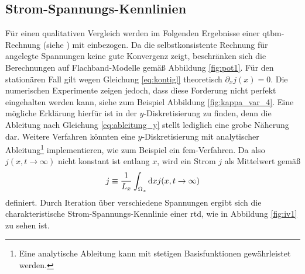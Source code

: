 \subsection{Strom-Spannungs-Kennlinien}
Für einen qualitativen Vergleich werden im Folgenden Ergebnisse einer \ac{qtbm}-Rechnung (siehe \cite{qtbm}) mit einbezogen. Da die selbstkonsistente Rechnung für angelegte Spannungen keine gute Konvergenz zeigt, beschränken sich die Berechnungen auf Flachband-Modelle gemäß Abbildung \ref{fig:pot1}. Für den stationären Fall gilt wegen Gleichung \eqref{eq:kontigl} theoretisch $\partial_x j(x)=0$. Die numerischen Experimente zeigen jedoch, dass diese Forderung nicht perfekt eingehalten werden kann, siehe zum Beispiel Abbildung \ref{fig:kappa_var_4}. Eine mögliche Erklärung hierfür ist in der $y$-Diskretisierung zu finden, denn die Ableitung nach Gleichung \eqref{eq:ableitung_y} stellt lediglich eine grobe Näherung dar. Weitere Verfahren könnten eine $y$-Diskretisierung mit analytischer Ableitung\footnote{Eine analytische Ableitung kann mit stetigen Basisfunktionen gewährleistet werden.} implementieren, wie zum Beispiel ein \ac{fem}-Verfahren.
Da also ${j(x,t\rightarrow \infty)}$ nicht konstant ist entlang $x$, wird ein Strom $j$ als Mittelwert gemäß
\begin{equation*}
  j \equiv \frac{1}{L_x} \int_{\Omega_x} \mathop{}\!\mathrm{d} x j(x,t\rightarrow\infty)
\end{equation*}
definiert. Durch Iteration über verschiedene Spannungen ergibt sich die charakteristische Strom-Spannungs-Kennlinie einer \ac{rtd}, wie in Abbildung \ref{fig:iv1} zu sehen ist.

